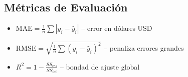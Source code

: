\subsection{Métricas de Evaluación}
\begin{itemize}
  \item $\text{MAE} = \frac{1}{n}\sum|y_i - \hat{y}_i|$ -- error en dólares USD
  \item $\text{RMSE} = \sqrt{\frac{1}{n}\sum(y_i - \hat{y}_i)^2}$ -- penaliza errores grandes
  \item $R^2 = 1 - \frac{SS_{res}}{SS_{tot}}$ -- bondad de ajuste global
\end{itemize}
